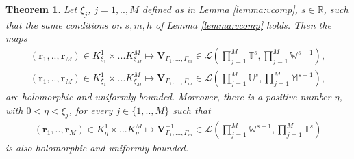 \documentclass{article}
\newtheorem{theorem}{Theorem}[section]
\newcommand{\IM}{{\mathbb M}}
\newcommand{\IR}{{\mathbb R}}
\newcommand{\IU}{{\mathbb U}}
\newcommand{\IT}{{\mathbb T}}
\newcommand{\IW}{{\mathbb W}}
\newcommand{\br}{\bm{r}}
\begin{document}
\begin{theorem}
Let $\xi_j$, $j=1,..,M$ defined as in Lemma \ref{lemma:vcomp}, $s \in \IR$, such that the same conditions on $s,m,h$ of Lemma \ref{lemma:vcomp} holds. Then the maps 
\begin{align*}
(\br_1,..,\br_M) \in K^1_{\xi_1} \times ... K^M_{\xi_M} \mapsto 
\mathbf{V}_{\Gamma_1,\hdots,\Gamma_m} \in \mathcal{L}(\prod_{j=1}^M \IT^s, \prod_{j=1}^M \IW^{s+1}) , \\
(\br_1,..,\br_M) \in K^1_{\xi_1} \times ... K^M_{\xi_M} \mapsto 
\mathbf{V}_{\Gamma_1,\hdots,\Gamma_m} \in \mathcal{L}(\prod_{j=1}^M \IU^s, \prod_{j=1}^M \IM^{s+1}) ,
\end{align*}
are holomorphic and uniformly bounded. Moreover, there is a positive number $\eta$, with $0< \eta < \xi_j$, for every $j \in \{1,..,M\}$ such that 
\begin{align*}
(\br_1,..,\br_M) \in K^1_{\eta} \times ... K^M_{\eta} \mapsto 
\mathbf{V}_{\Gamma_1,\hdots,\Gamma_m}^{-1} \in \mathcal{L}(\prod_{j=1}^M \IW^{s+1}, \prod_{j=1}^M \IT^{s}) 
\end{align*}
is also holomorphic and uniformly bounded.
\end{theorem}
\end{document}
